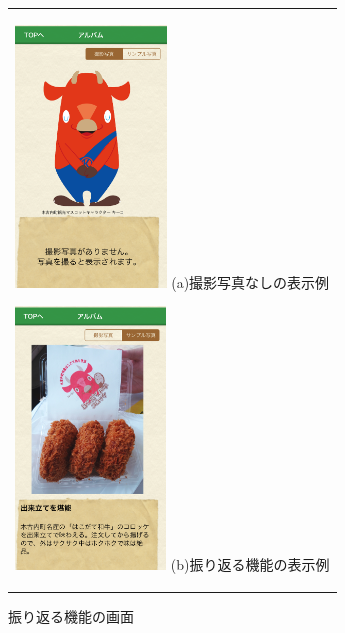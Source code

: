\begin{figure}[htbp]
  \begin{center}
    \begin{tabular}{c}

      \begin{minipage}{0.33\hsize}
        \begin{center}
\includegraphics[width=4cm, bb=0 0 304 570]{album1.png}
          \hspace{1cm} (a)撮影写真なしの表示例
        \end{center}
      \end{minipage}
      
      \begin{minipage}{0.33\hsize}
        \begin{center}
\includegraphics[width=4cm, bb=0 0 304 570]{album2.png}
          \hspace{1cm} (b)振り返る機能の表示例
        \end{center}
      \end{minipage}

    \end{tabular}
    \caption{振り返る機能の画面}
    \label{fig:lena}
  \end{center}
\end{figure}　　　　　　　　　　　　　　　　　　　　　　　　　　　　　　　　　　　　　　　　　　　　　　　　　　　　　　　　　　　　　　　　　　　　　　　　　　　　　　　　　　　　　　　　　　　　　　　　　　　　　　　　　　　　　　　　　　　　　　　　　　　　　　　　　　　